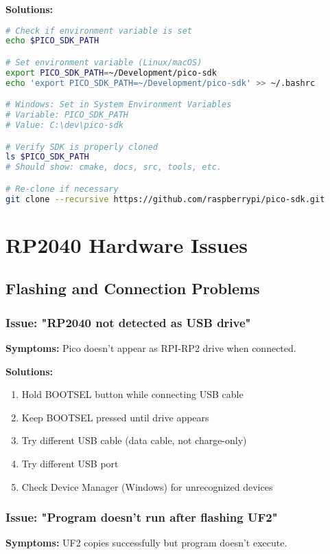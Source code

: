 \documentclass[11pt,a4paper]{article}
\begin{document}
\textbf{Solutions:}
\begin{lstlisting}[language=bash]
# Check if environment variable is set
echo $PICO_SDK_PATH

# Set environment variable (Linux/macOS)
export PICO_SDK_PATH=~/Development/pico-sdk
echo 'export PICO_SDK_PATH=~/Development/pico-sdk' >> ~/.bashrc

# Windows: Set in System Environment Variables
# Variable: PICO_SDK_PATH
# Value: C:\dev\pico-sdk

# Verify SDK is properly cloned
ls $PICO_SDK_PATH
# Should show: cmake, docs, src, tools, etc.

# Re-clone if necessary
git clone --recursive https://github.com/raspberrypi/pico-sdk.git
\end{lstlisting}

\section{RP2040 Hardware Issues}

\subsection{Flashing and Connection Problems}

\subsubsection{Issue: "RP2040 not detected as USB drive"}
\textbf{Symptoms:} Pico doesn't appear as RPI-RP2 drive when connected.

\textbf{Solutions:}
\begin{enumerate}
    \item Hold BOOTSEL button while connecting USB cable
    \item Keep BOOTSEL pressed until drive appears
    \item Try different USB cable (data cable, not charge-only)
    \item Try different USB port
    \item Check Device Manager (Windows) for unrecognized devices
\end{enumerate}

\subsubsection{Issue: "Program doesn't run after flashing UF2"}
\textbf{Symptoms:} UF2 copies successfully but program doesn't execute.
\end{document}
